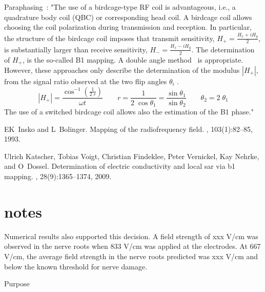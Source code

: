 \documentclass{article}
\begin{document}
Paraphasing~\cite{katscher2009determination}: 
"The use of a birdcage-type RF coil is advantageous,
i.e., a quadrature body coil (QBC) or corresponding
head coil. A birdcage coil allows choosing the coil polarization
during transmission and reception. In particular,
the structure of the birdcage
coil imposes that transmit sensitivity,
$H_+ = \frac{H_x + i H_y}{2}$, is substantially larger than receive sensitivity,
$H_- = \frac{H_x - i H_y}{2}$.
The determination of $H_+$, is the so-called B1 mapping. 
A double angle method~\cite{insko1993mapping} is appropriate.
However, these approaches only describe the determination of the modulus 
$|H_+|$, from the signal ratio observed at the two flip angles $\theta_i$ .
\begin{equation}
 |H_+| = \frac{\cos^{-1}\left(\frac{1}{2\;r}\right)}{\omega t}
  \qquad
  r = \frac{1}{2 \; \cos \theta_1} = \frac{\sin \theta_1}{\sin \theta_2}
  \qquad
  \theta_2 = 2 \; \theta_1
\end{equation}
The use of a switched birdcage coil allows also the estimation of the B1
phase."




\begin{thebibliography}{10}
EK~Insko and L~Bolinger.
\newblock Mapping of the radiofrequency field.
, 103(1):82--85, 1993.

Ulrich Katscher, Tobias Voigt, Christian Findeklee, Peter Vernickel, Kay
  Nehrke, and O~Dossel.
\newblock Determination of electric conductivity and local sar via b1 mapping.
, 28(9):1365--1374, 2009.

\end{thebibliography}

\pagebreak
\section{notes}


Numerical results also supported this decision. A field strength of xxx
V/cm was observed in the nerve roots when 833 V/cm was applied at the
electrodes. At 667 V/cm, the average field strength in the nerve roots
predicted was xxx V/cm and below the known threshold for nerve damage. 


Purpose
\end{document}
